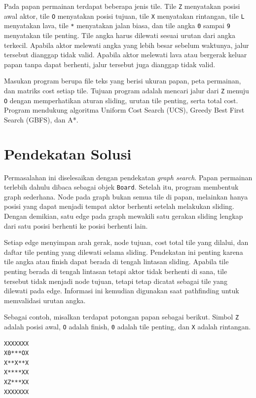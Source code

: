 \documentclass[a4paper,11pt]{article}
\begin{document}
Pada papan permainan terdapat beberapa jenis tile. Tile \texttt{Z} menyatakan posisi awal aktor, tile \texttt{O} menyatakan posisi tujuan, tile \texttt{X} menyatakan rintangan, tile \texttt{L} menyatakan lava, tile \texttt{*} menyatakan jalan biasa, dan tile angka \texttt{0} sampai \texttt{9} menyatakan tile penting. Tile angka harus dilewati sesuai urutan dari angka terkecil. Apabila aktor melewati angka yang lebih besar sebelum waktunya, jalur tersebut dianggap tidak valid. Apabila aktor melewati lava atau bergerak keluar papan tanpa dapat berhenti, jalur tersebut juga dianggap tidak valid.

Masukan program berupa file teks yang berisi ukuran papan, peta permainan, dan matriks cost setiap tile. Tujuan program adalah mencari jalur dari \texttt{Z} menuju \texttt{O} dengan memperhatikan aturan sliding, urutan tile penting, serta total cost. Program mendukung algoritma Uniform Cost Search (UCS), Greedy Best First Search (GBFS), dan A*.

\section{Pendekatan Solusi}
Permasalahan ini diselesaikan dengan pendekatan \textit{graph search}. Papan permainan terlebih dahulu dibaca sebagai objek \texttt{Board}. Setelah itu, program membentuk graph sederhana. Node pada graph bukan semua tile di papan, melainkan hanya posisi yang dapat menjadi tempat aktor berhenti setelah melakukan sliding. Dengan demikian, satu edge pada graph mewakili satu gerakan sliding lengkap dari satu posisi berhenti ke posisi berhenti lain.

Setiap edge menyimpan arah gerak, node tujuan, cost total tile yang dilalui, dan daftar tile penting yang dilewati selama sliding. Pendekatan ini penting karena tile angka atau finish dapat berada di tengah lintasan sliding. Apabila tile penting berada di tengah lintasan tetapi aktor tidak berhenti di sana, tile tersebut tidak menjadi node tujuan, tetapi tetap dicatat sebagai tile yang dilewati pada edge. Informasi ini kemudian digunakan saat pathfinding untuk memvalidasi urutan angka.

Sebagai contoh, misalkan terdapat potongan papan sebagai berikut. Simbol \texttt{Z} adalah posisi awal, \texttt{O} adalah finish, \texttt{0} adalah tile penting, dan \texttt{X} adalah rintangan.

\begin{lstlisting}[caption=Contoh Board Sederhana]
XXXXXXX
X0***OX
X**X**X
X****XX
XZ***XX
XXXXXXX
\end{lstlisting}
\end{document}
